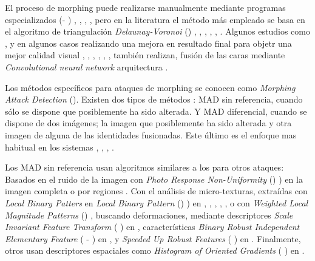 El proceso de \gls{morphing} puede realizarse manualmente mediante programas especializados (- \cite{GimpOnline}) \cite{raghavendra2016Detecting} , \cite{scherhag2017vulnerability}, \cite{ferrara2017face}, \cite{ferrara2018face}, pero en la literatura el método más empleado se basa en el algoritmo de triangulación \textit{Delaunay-Voronoi} () \cite{scherhag2018towards}, \cite{scherhag2018morph}, \cite{scherhag2018performance}, \cite{spreeuwers2018towards}, \cite{debiasi2018prnu}, \cite{debiasi2018prnuvar}. Algunos estudios como \cite{damer2018morgan} \cite{peng2019fd}, y en algunos casos realizando una mejora en resultado final para objetr una mejor calidad visual \cite{kraetzer2017modeling}, \cite{zhang2018face}, \cite{makrushin2017automatic}, \cite{seibold2018reflection}, \cite{seibold2018accurate}, \cite{wandzik2018morphing}, también realizan, fusión de las caras mediante \textit{Convolutional neural network}  arquitectura  \cite{damer2018morgan}. 

Los métodos  específicos para ataques de morphing se conocen como \textit{Morphing Attack Detection} (). Existen dos tipos de métodos : \Gls{MAD sin referencia}, cuando sólo se dispone que posiblemente ha sido alterada. Y \Gls{MAD diferencial}, cuando se dispone de dos imágenes; la imagen que posiblemente ha sido alterada y otra imagen de alguna de las identidades fusionadas. Este último es el enfoque mas habitual en los sistemas \cite{scherhag2018towards}, \cite{peng2019fd}, \cite{ferrara2017face}, \cite{ferrara2018face}. 

Los \Gls{MAD sin referencia} usan algoritmos similares a los  para otros ataques: Basados en el ruido de la imagen con \textit{Photo Response  Non-Uniformity} () \cite{lukas2006digital}) en la imagen completa \cite{debiasi2018prnu} o por regiones \cite{debiasi2018prnuvar}. Con el análisis de \gls{micro-texturas}, extraídas con \textit{Local Binary Patters}  en  \textit{Local Binary Pattern} () \cite{ojala2000gray}) en  \cite{raghavendra2017face} , \cite{asaad2017topological}, \cite{jassim2018automatic}, \cite{spreeuwers2018towards}, \cite{damer2018morgan}, \cite{wandzik2018morphing} o con \textit{Weighted Local Magnitude Patterns} () \cite{agarwal2017swapped}, buscando deformaciones, mediante descriptores \textit{Scale Invariant Feature Transform} ( \cite{lowe2004distinctive}) en \cite{neubert2017face}, características \textit{Binary Robust Independent Elementary Feature} ( - \cite{kannala2012bsif}) en \cite{raghavendra2016Detecting}, y \textit{Speeded Up Robust Features} ( \cite{bay2008speeded}) en \cite{kraetzer2017modeling}. Finalmente, otros usan descriptores espaciales como \textit{Histogram of Oriented Gradients} ( \cite{shu2011histogram}) en \cite{scherhag2018performance}. 

